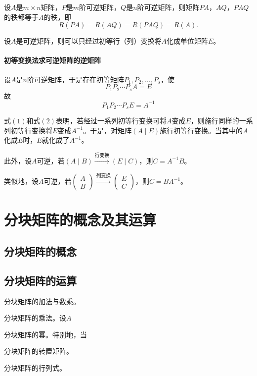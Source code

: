 \begin{corollary}
设$A$是$m\times n$矩阵，$P$是$m$阶可逆矩阵，$Q$是$n$阶可逆矩阵，则矩阵$PA$，$AQ$，$PAQ$的秩都等于$A$的秩，即
\[
R(PA)=R(AQ)=R(PAQ)=R(A).
\]
\end{corollary}

\begin{corollary}
设$A$是可逆矩阵，则可以只经过初等行（列）变换将$A$化成单位矩阵$E$。
\end{corollary}

\paragraph{初等变换法求可逆矩阵的逆矩阵}
设$A$是$n$阶可逆矩阵，于是存在初等矩阵$P_1,P_2,\dots,P_s$，使
\[
P_1P_2\cdots P_sA=E \tag{1}
\]
故
\[
P_1P_2\cdots P_sE=A^{-1} \tag{2}
\]

式$(1)$和式$(2)$表明，若经过一系列初等行变换可将$A$变成$E$，则施行同样的一系列初等行变换将$E$变成$A^{-1}$。于是，对矩阵$(A\mid E)$施行初等行变换。当其中的$A$化成$E$时，$E$就化成了$A^{-1}$。

此外，设$A$可逆，若$(A\mid B)\xrightarrow{\text{行变换}}(E\mid C)$，则$C=A^{-1}B$。

类似地，设$A$可逆，若$\begin{pmatrix}A\\B\end{pmatrix}\xrightarrow{\text{列变换}}\begin{pmatrix}E\\C\end{pmatrix}$，则$C=BA^{-1}$。


\section{分块矩阵的概念及其运算}

\subsection{分块矩阵的概念}
\subsection{分块矩阵的运算}
分块矩阵的加法与数乘。

分块矩阵的乘法。设$A$ %

分块矩阵的幂。特别地，当 %

分块矩阵的转置矩阵。

分块矩阵的行列式。

